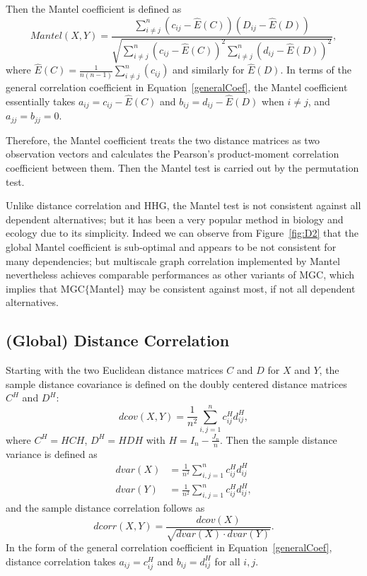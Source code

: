 \documentclass[11pt]{article}
\begin{document}
Then the Mantel coefficient \cite{Mantel1967} is defined as 
\begin{equation}
Mantel(X,Y)=\frac{\sum_{i \neq j}^{n}(c_{ij}-\hat{E}(C))(D_{ij}-\hat{E}(D))}{\sqrt{\sum_{i \neq j}^{n}(c_{ij}-\hat{E}(C))^2 \sum_{i \neq j}^{n}(d_{ij}-\hat{E}(D))^2}},
\end{equation}
where $\hat{E}(C)=\frac{1}{n(n-1)}\sum_{i \neq j}^{n}(c_{ij})$ and similarly for $\hat{E}(D)$. In terms of the general correlation coefficient in Equation~\ref{generalCoef}, the Mantel coefficient essentially takes $a_{ij}=c_{ij}-\hat{E}(C)$ and $b_{ij}=d_{ij}-\hat{E}(D)$ when $i \neq j$, and $a_{jj}=b_{jj}=0$.

Therefore, the Mantel coefficient treats the two distance matrices as two observation vectors and calculates the Pearson's product-moment correlation coefficient between them. Then the Mantel test is carried out by the permutation test.

Unlike distance correlation and HHG, the Mantel test is not consistent against all dependent alternatives; but it has been a very popular method in biology and ecology due to its simplicity. Indeed we can observe from Figure~\ref{fig:D2} that the global Mantel coefficient is sub-optimal and appears to be not consistent for many dependencies; but multiscale graph correlation implemented by Mantel nevertheless achieves comparable performances as other variants of MGC, which implies that MGC$\{$Mantel$\}$ may be consistent against most, if not all dependent alternatives.

\subsection{(Global) Distance Correlation}
\label{appen:dcorr}
Starting with the two Euclidean distance matrices $C$ and $D$ for $X$ and $Y$, the sample distance covariance is defined on the doubly centered distance matrices $C^{H}$ and $D^{H}$:
\begin{equation}
\label{dcovEqu}
dcov(X,Y)=\frac{1}{n^2}\sum_{i,j=1}^{n}c^{H}_{ij}d^{H}_{ij},
\end{equation}
where $C^{H}=HCH$, $D^{H}=HDH$ with $H=I_{n}-\frac{J_{n}}{n}$. Then the sample distance variance is defined as
\begin{align*}
dvar(X) &=\frac{1}{n^2}\sum_{i,j=1}^{n}c^{H}_{ij}d^{H}_{ij}\\
dvar(Y) &=\frac{1}{n^2}\sum_{i,j=1}^{n}c^{H}_{ij}d^{H}_{ij},
\end{align*}
and the sample distance correlation follows as
\begin{equation}
\label{dcorrEqu}
dcorr(X,Y)=\frac{dcov(X)}{\sqrt{dvar(X) \cdot dvar(Y)}}.
\end{equation}
In the form of the general correlation coefficient in Equation~\ref{generalCoef}, distance correlation takes $a_{ij}=c^{H}_{ij}$ and $b_{ij}=d^{H}_{ij}$ for all $i,j$.
\end{document}
